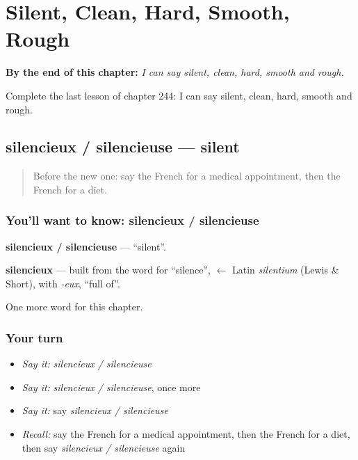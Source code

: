 
\chapter{Silent, Clean, Hard, Smooth, Rough}
\label{ch:fr-silent-clean-hard-smooth-rough}

\begin{chapteropening}
\textbf{By the end of this chapter:} \emph{I can say silent, clean, hard, smooth and rough.}

Complete the last lesson of chapter 244: I can say silent, clean, hard, smooth and rough.
\end{chapteropening}

\section[silencieux / silencieuse]{silencieux / silencieuse — silent}

\label{lesson:FR-C244-silencieux-silencieuse}



\begin{quote}
Before the new one: say the French for a medical appointment, then the French for a diet.
\end{quote}

\subsection*{You'll want to know: silencieux / silencieuse}
\textbf{silencieux / silencieuse} — \textquotedblleft{}silent\textquotedblright{}.

\begin{cousinweb}
\textbf{silencieux} — built from the word for \textquotedblleft{}silence\textquotedblright{}, $\leftarrow$ Latin \emph{silentium} (Lewis \& Short), with \emph{-eux}, \textquotedblleft{}full of\textquotedblright{}.
\end{cousinweb}

\begin{grammarlens}[title={What you've built}]
One more word for this chapter.
\end{grammarlens}

\subsection*{Your turn}
\begin{itemize}
\raggedright
  \item \emph{Say it:} \emph{silencieux / silencieuse}
  \item \emph{Say it:} \emph{silencieux / silencieuse}, once more
  \item \emph{Say it:} say \emph{silencieux / silencieuse}
  \item \emph{Recall:} say the French for a medical appointment, then the French for a diet, then say \emph{silencieux / silencieuse} again
\end{itemize}

